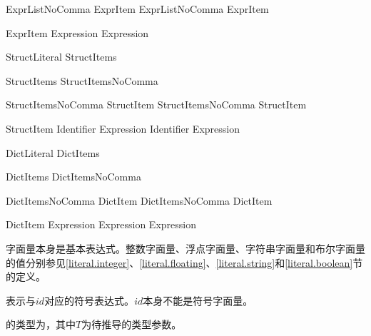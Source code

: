 \begin{bnf}{ExprListNoComma}
    ExprItem \br
    ExprListNoComma \terminal{,} ExprItem
\end{bnf}

\begin{bnf}{ExprItem}
    Expression \br
     Expression
\end{bnf}

\begin{bnf}{StructLiteral}
    \terminal{(} StructItems\bnfq \terminal{)}
\end{bnf}

\begin{bnf}{StructItems}
    StructItemsNoComma \terminal{,}\bnfq
\end{bnf}

\begin{bnf}{StructItemsNoComma}
    StructItem \br
    StructItemsNoComma \terminal{,} StructItem
\end{bnf}

\begin{bnf}{StructItem}
    Identifier \terminal{:} Expression \br
    Identifier \br
     Expression
\end{bnf}

\begin{bnf}{DictLiteral}
    \terminal{[} DictItems \terminal{]} \br
    \terminal{[} \terminal{:} \terminal{]}
\end{bnf}

\begin{bnf}{DictItems}
    DictItemsNoComma \terminal{,}\bnfq
\end{bnf}

\begin{bnf}{DictItemsNoComma}
    DictItem \br
    DictItemsNoComma \terminal{,} DictItem
\end{bnf}

\begin{bnf}{DictItem}
    Expression \terminal{:} Expression \br
     Expression
\end{bnf}

\pnum
字面量本身是基本表达式。整数字面量、浮点字面量、字符串字面量和布尔字面量的值分别参见\ref{literal.integer}、\ref{literal.floating}、\ref{literal.string}和\ref{literal.boolean}节的定义。

\pnum
{}表示与$id$对应的符号表达式。$id$本身不能是符号字面量。

\pnum
{}的类型为，其中$T$为待推导的类型参数。

